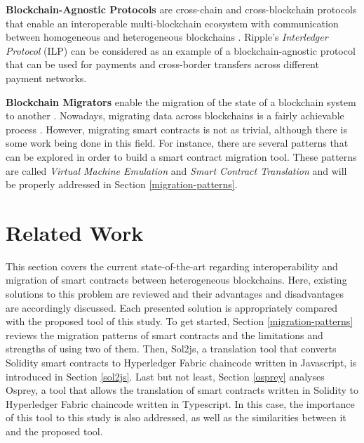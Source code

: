 \documentclass[runningheads]{llncs}
\begin{document}
\textbf{Blockchain-Agnostic Protocols} are cross-chain and cross-blockchain protocols that enable an interoperable multi-blockchain ecosystem with communication between homogeneous and heterogeneous blockchains \cite{survey}. Ripple's \cite{xrp} \textit{Interledger Protocol} (ILP) \cite{xrp_ilp} can be considered as an example of a blockchain-agnostic protocol that can be used for payments and cross-border transfers across different payment networks.

\textbf{Blockchain Migrators} enable the migration of the state of a blockchain system to another \cite{abrunhosa_2021}. Nowadays, migrating data across blockchains is a fairly achievable process \cite{survey}. However, migrating smart contracts is not as trivial, although there is some work being done in this field. For instance, there are several patterns \cite{bandara_xu_weber_2019} that can be explored in order to build a smart contract migration tool. These patterns are called \textit{Virtual Machine Emulation} and \textit{Smart Contract Translation} and will be properly addressed in Section \ref{migration-patterns}.

\section{Related Work} \label{related_work}

This section covers the current state-of-the-art regarding interoperability and migration of smart contracts between heterogeneous blockchains. Here, existing solutions to this problem are reviewed and their advantages and disadvantages are accordingly discussed. Each presented solution is appropriately compared with the proposed tool of this study. %
To get started, Section \ref{migration-patterns}  reviews the migration patterns of smart contracts and the limitations and strengths of using two of them. Then, Sol2js, a translation tool that converts Solidity smart contracts to Hyperledger Fabric chaincode written in Javascript, is introduced in Section \ref{sol2js}. Last but not least, Section \ref{osprey} analyses Osprey, a tool that allows the translation of smart contracts written in Solidity to Hyperledger Fabric chaincode written in Typescript. In this case, the importance of this tool to this study is also addressed, as well as the similarities between it and the proposed tool.
\end{document}
